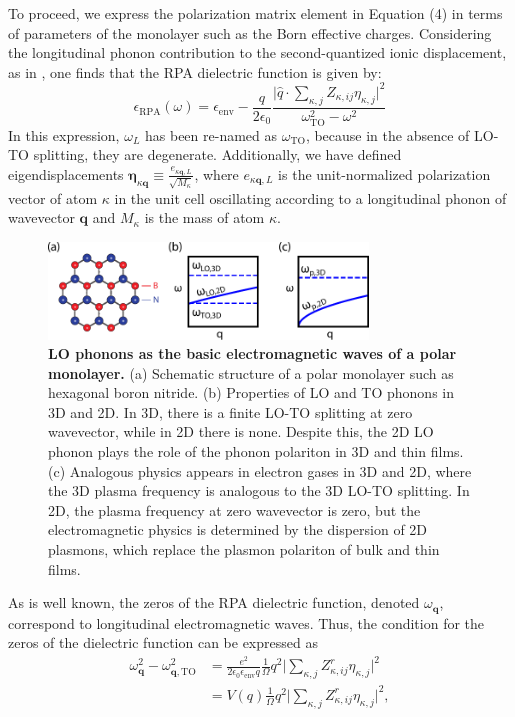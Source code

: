 \documentclass[aps,prb,twocolumn,
groupedaddress,superscriptaddress,
amsfonts,amssymb,amsmath,floatfix,
citeautoscript]{revtex4-1}
\begin{document}
	To proceed, we express the polarization matrix element in Equation (4) in terms of parameters of the monolayer such as the Born effective charges. Considering the longitudinal phonon contribution to the second-quantized ionic displacement, as in \cite{srivastava1990physics}, one finds that the RPA dielectric function is given by:
	\begin{equation}
	\epsilon_{\mathrm{RPA}}(\omega) = \epsilon_{\mathrm{env}} - \frac{q}{2\epsilon_0}\frac{\Big|\hat{q}\cdot\sum\limits_{\kappa,j} Z_{\kappa,ij}\eta_{\kappa,j}  \Big|^2}{\omega^2_{\mathrm{TO}}-\omega^2}
	\end{equation}
	In this expression, $\omega_L$ has been re-named as $\omega_{\mathrm{TO}}$, because in the absence of LO-TO splitting, they are degenerate. Additionally, we have defined eigendisplacements $\boldsymbol{\eta}_{\kappa\mathbf{q}}\equiv \frac{e_{\kappa\mathbf{q},L}}{\sqrt{M_{\kappa}}}$, where $e_{\kappa\mathbf{q},L}$ is the unit-normalized polarization vector of atom $\kappa$ in the unit cell oscillating according to a longitudinal phonon of wavevector $\mathbf{q}$ and $M_{\kappa}$ is the mass of atom $\kappa$.
	\begin{figure}[t]
		\includegraphics[width=85mm]{fig1.pdf}
		\caption{\textbf{LO phonons as the basic electromagnetic waves of a polar monolayer.} (a) Schematic structure of a polar monolayer such as hexagonal boron nitride. (b) Properties of LO and TO phonons in 3D and 2D. In 3D, there is a finite LO-TO splitting at zero wavevector, while in 2D there is none. Despite this, the 2D LO phonon plays the role of the phonon polariton in 3D and thin films. (c) Analogous physics appears in electron gases in 3D and 2D, where the 3D plasma frequency is analogous to the 3D LO-TO splitting. In 2D, the plasma frequency at zero wavevector is zero, but the electromagnetic physics is determined by the dispersion of 2D plasmons, which replace the plasmon polariton of bulk and thin films.}
	\end{figure}
	As is well known, the zeros of the RPA dielectric function, denoted $\omega_{\mathbf{q}}$, correspond to longitudinal electromagnetic waves. Thus, the condition for the zeros of the dielectric function can be expressed as 
	\begin{align}
	\omega^2_{\mathbf{q}} - \omega^2_{\mathbf{q},\mathrm{TO}} &= \frac{e^2}{2\epsilon_0\epsilon_{\mathrm{env}}q}\frac{1}{\Omega}q^2\Big|\sum\limits_{\kappa,j}Z^r_{\kappa,ij}\eta_{\kappa,j}  \Big|^2 \nonumber \\
	&= V(q)\frac{1}{\Omega}q^2\Big|\sum\limits_{\kappa,j}Z^r_{\kappa,ij}\eta_{\kappa,j}  \Big|^2,
	\end{align}
\end{document}
